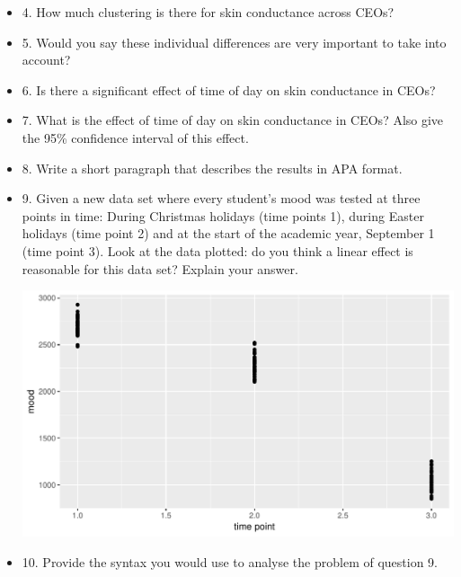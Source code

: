 \documentclass[]{report}\usepackage[]{graphicx}\usepackage[]{color}
\makeatletter
\def\maxwidth{ %
  \ifdim\Gin@nat@width>\linewidth
    \linewidth
  \else
    \Gin@nat@width
  \fi
}
\newenvironment{knitrout}{}{} %
\makeatother
\begin{document}
\begin{itemize}
\item 4. How much clustering is there for skin conductance across CEOs? \\
\item 5. Would you say these individual differences are very important to take into account? \\
\item 6. Is there a significant effect of time of day on skin conductance in CEOs?\\
\item 7. What is the effect of time of day on skin conductance in CEOs? Also give the 95\% confidence interval of this effect.
\item 8. Write a short paragraph that describes the results in APA format.
\item 9. Given a new data set where every student's mood was tested at three points in time: During Christmas holidays (time points 1), during Easter holidays (time point 2) and at the start of the academic year, September 1 (time point 3). Look at the data plotted: do you think a linear effect is reasonable for this data set? Explain your answer.

\begin{knitrout}
\color{fgcolor}

{\centering \includegraphics[width=\maxwidth]{figure/analysispremidpost8-1} 

}



\end{knitrout}

\item 10. Provide the syntax you would use to analyse the problem of question 9.


\end{itemize}
\end{document}

